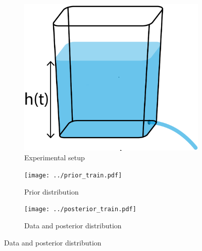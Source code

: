 \documentclass[openacc]{rsproca_new}%
\begin{document}
\begin{figure}[h!]
    \centering
        \begin{subfigure}[b]{0.3\textwidth}
    	\includegraphics[width=\textwidth]{../tank_geometry/naked_tank.pdf}
	\caption{Experimental setup} \label{fig:naked_tank}
    \end{subfigure}
    
     \begin{subfigure}[b]{0.49\textwidth}
    	\texttt{[image: ../prior\_train.pdf]}
	\caption{Prior distribution} \label{fig:prior_train}
    \end{subfigure}
     \begin{subfigure}[b]{0.49\textwidth}
    	\texttt{[image: ../posterior\_train.pdf]}
	\caption{Data and posterior distribution} \label{fig:posterior_train}
    \end{subfigure}
    

\end{figure}
\end{document}

